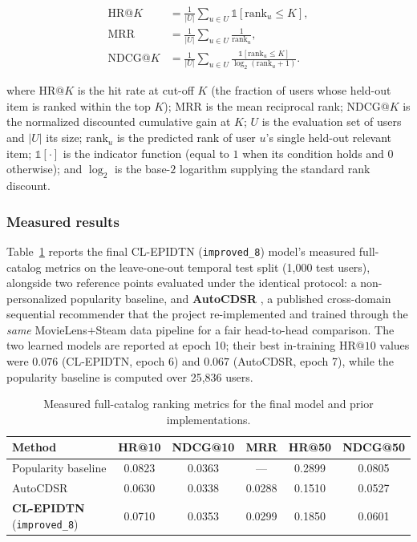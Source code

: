 \begin{align}
\mathrm{HR}@K   &= \frac{1}{|U|}\sum_{u\in U}\mathbb{1}\!\left[\mathrm{rank}_u \le K\right], \\
\mathrm{MRR}    &= \frac{1}{|U|}\sum_{u\in U}\frac{1}{\mathrm{rank}_u}, \\
\mathrm{NDCG}@K &= \frac{1}{|U|}\sum_{u\in U}\frac{\mathbb{1}\!\left[\mathrm{rank}_u \le K\right]}{\log_2(\mathrm{rank}_u + 1)} .
\end{align}

where $\mathrm{HR}@K$ is the hit rate at cut-off $K$ (the fraction of users whose held-out item is ranked within the top $K$); $\mathrm{MRR}$ is the mean reciprocal rank; $\mathrm{NDCG}@K$ is the normalized discounted cumulative gain at $K$; $U$ is the evaluation set of users and $|U|$ its size; $\mathrm{rank}_u$ is the predicted rank of user $u$'s single held-out relevant item; $\mathbb{1}[\cdot]$ is the indicator function (equal to $1$ when its condition holds and $0$ otherwise); and $\log_2$ is the base-$2$ logarithm supplying the standard rank discount.

\subsubsection{Measured results}
Table~\ref{tab:clepidtn_measured} reports the final CL-EPIDTN (\texttt{improved\_8}) model's measured full-catalog metrics on the leave-one-out temporal test split (1{,}000 test users), alongside two reference points evaluated under the identical protocol: a non-personalized popularity baseline, and \textbf{AutoCDSR} \cite{ju2025autocdsr}, a published cross-domain sequential recommender that the project re-implemented and trained through the \emph{same} MovieLens$+$Steam data pipeline for a fair head-to-head comparison. The two learned models are reported at epoch 10; their best in-training $\mathrm{HR}@10$ values were $0.076$ (CL-EPIDTN, epoch 6) and $0.067$ (AutoCDSR, epoch 7), while the popularity baseline is computed over 25{,}836 users.

\begin{table}[H]
    \centering
    \caption{Measured full-catalog ranking metrics for the final model and prior implementations.}
    \label{tab:clepidtn_measured}
    \small
    \setlength{\tabcolsep}{4pt}
    \begin{tabular}{|l|c|c|c|c|c|}
        \hline
        \textbf{Method} & \textbf{HR@10} & \textbf{NDCG@10} & \textbf{MRR} & \textbf{HR@50} & \textbf{NDCG@50} \\ \hline
        Popularity baseline & 0.0823 & 0.0363 & --- & 0.2899 & 0.0805 \\ \hline
        AutoCDSR \cite{ju2025autocdsr} & 0.0630 & 0.0338 & 0.0288 & 0.1510 & 0.0527 \\ \hline
        \textbf{CL-EPIDTN} (\texttt{improved\_8}) & 0.0710 & 0.0353 & 0.0299 & 0.1850 & 0.0601 \\ \hline
    \end{tabular}
\end{table}

